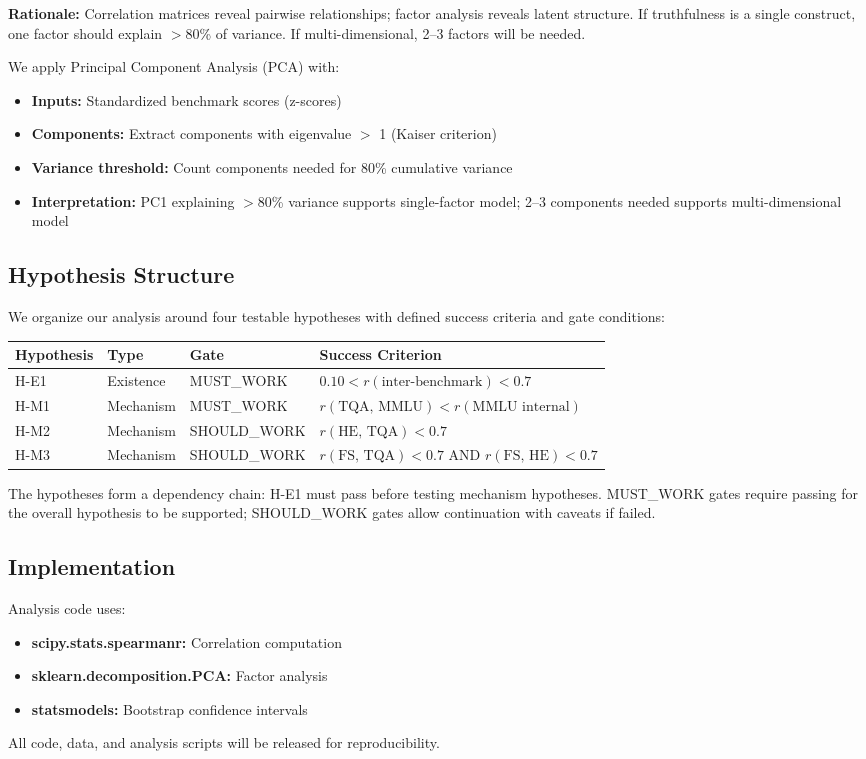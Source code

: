 \textbf{Rationale:} Correlation matrices reveal pairwise relationships; factor analysis reveals latent structure. If truthfulness is a single construct, one factor should explain $>$80\% of variance. If multi-dimensional, 2--3 factors will be needed.

We apply Principal Component Analysis (PCA) with:
\begin{itemize}
\item \textbf{Inputs:} Standardized benchmark scores (z-scores)
\item \textbf{Components:} Extract components with eigenvalue $>$ 1 (Kaiser criterion)
\item \textbf{Variance threshold:} Count components needed for 80\% cumulative variance
\item \textbf{Interpretation:} PC1 explaining $>$80\% variance supports single-factor model; 2--3 components needed supports multi-dimensional model
\end{itemize}

\subsection{Hypothesis Structure}

We organize our analysis around four testable hypotheses with defined success criteria and gate conditions:

\begin{table}[h]
\centering
\begin{tabular}{@{}llll@{}}
\toprule
\textbf{Hypothesis} & \textbf{Type} & \textbf{Gate} & \textbf{Success Criterion} \\
\midrule
H-E1 & Existence & MUST\_WORK & $0.10 < r(\text{inter-benchmark}) < 0.7$ \\
H-M1 & Mechanism & MUST\_WORK & $r(\text{TQA, MMLU}) < r(\text{MMLU internal})$ \\
H-M2 & Mechanism & SHOULD\_WORK & $r(\text{HE, TQA}) < 0.7$ \\
H-M3 & Mechanism & SHOULD\_WORK & $r(\text{FS, TQA}) < 0.7$ AND $r(\text{FS, HE}) < 0.7$ \\
\bottomrule
\end{tabular}
\end{table}

The hypotheses form a dependency chain: H-E1 must pass before testing mechanism hypotheses. MUST\_WORK gates require passing for the overall hypothesis to be supported; SHOULD\_WORK gates allow continuation with caveats if failed.

\subsection{Implementation}

Analysis code uses:
\begin{itemize}
\item \textbf{scipy.stats.spearmanr:} Correlation computation
\item \textbf{sklearn.decomposition.PCA:} Factor analysis
\item \textbf{statsmodels:} Bootstrap confidence intervals
\end{itemize}

All code, data, and analysis scripts will be released for reproducibility.
